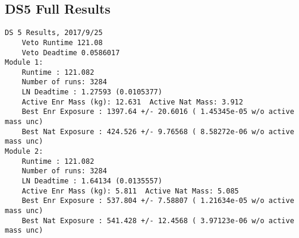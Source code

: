 \documentclass[notitlepage,rmp,aps,10pt]{revtex4-1}
\begin{document}
\subsection{DS5 Full Results}
\begin{verbatim}
DS 5 Results, 2017/9/25
	Veto Runtime 121.08
	Veto Deadtime 0.0586017
Module 1:
	Runtime : 121.082
	Number of runs: 3284
	LN Deadtime : 1.27593 (0.0105377)
	Active Enr Mass (kg): 12.631  Active Nat Mass: 3.912
	Best Enr Exposure : 1397.64 +/- 20.6016 ( 1.45345e-05 w/o active mass unc)
	Best Nat Exposure : 424.526 +/- 9.76568 ( 8.58272e-06 w/o active mass unc)
Module 2:
	Runtime : 121.082
	Number of runs: 3284
	LN Deadtime : 1.64134 (0.0135557)
	Active Enr Mass (kg): 5.811  Active Nat Mass: 5.085
	Best Enr Exposure : 537.804 +/- 7.58807 ( 1.21634e-05 w/o active mass unc)
	Best Nat Exposure : 541.428 +/- 12.4568 ( 3.97123e-06 w/o active mass unc)


\end{verbatim}
\end{document}
